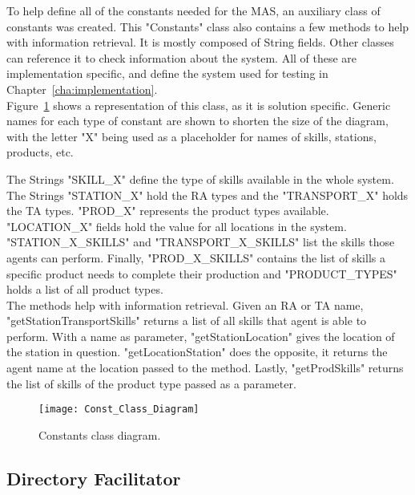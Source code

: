 To help define all of the constants needed for the \acrshort{MAS}, an auxiliary class of constants was created. This "Constants" class also contains a few methods to help with information retrieval. It is mostly composed of String fields. Other classes can reference it to check information about the system. All of these are implementation specific, and define the system used for testing in Chapter~\ref{cha:implementation}.\\

Figure~\ref{fig:const_class_diagram} shows a representation of this class, as it is solution specific. Generic names for each type of constant are shown to shorten the size of the diagram, with the letter "X" being used as a placeholder for names of skills, stations, products, etc. 

The Strings "SKILL\_X" define the type of skills available in the whole system. The Strings "STATION\_X" hold the \acrshort{RA} types and the "TRANSPORT\_X" holds the \acrshort{TA} types. "PROD\_X" represents the product types available. "LOCATION\_X" fields hold the value for all locations in the system. "STATION\_X\_SKILLS" and "TRANSPORT\_X\_SKILLS" list the skills those agents can perform. Finally, "PROD\_X\_SKILLS" contains the list of skills a specific product needs to complete their production and "PRODUCT\_TYPES" holds a list of all product types.\\

The methods help with information retrieval. Given an \acrshort{RA} or \acrshort{TA} name, "getStationTransportSkills" returns a list of all skills that agent is able to perform. With a name as parameter, "getStationLocation" gives the location of the station in question. "getLocationStation" does the opposite, it returns the agent name at the location passed to the method. Lastly, "getProdSkills" returns the list of skills of the product type passed as a parameter.\\

\begin{figure}[h!]
	\centering
	\texttt{[image: Const\_Class\_Diagram]}
	\caption{Constants class diagram.}
	\label{fig:const_class_diagram}
\end{figure}

\subsection{Directory Facilitator}
\label{subsec:directory_facilitator}

